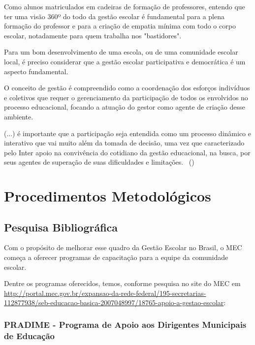 \documentclass[
	12pt,				%
	openright,			%
	oneside,
	a4paper,			%
	chapter=TITLE,		%
	section=TITLE,		%
	sumario=abnt-6027-2012,
	english,			%
	brazil				%
]{abntex2}
\newcommand{\citeaa}[1]{\citeauthoronline{#1}~(\citeyear{#1})}
\begin{document}
	Como alunos matriculados em cadeiras de formação de professores, entendo que ter uma visão 360º do todo da gestão escolar é fundamental para a plena formação do professor e para a criação de empatia mínima com todo o corpo escolar, notadamente para quem trabalha nos "bastidores".
	
	Para   um   bom   desenvolvimento   de   uma   escola, ou de uma comunidade escolar local,   é   preciso   considerar   que a gestão escolar participativa e democrática é um aspecto fundamental. 
	
	O   conceito   de   gestão   é   compreendido   como   a   coordenação   dos   esforços indivíduos  e   coletivos   que   requer   o   gerenciamento   da   participação   de   todos   os envolvidos no processo educacional, focando a atuação do gestor como agente de criação desse ambiente.
	
	\begin{citacao}
		(...) é importante que a participação seja entendida como um processo dinâmico e interativo que vai muito além da tomada de decisão, uma vez que caracterizado pelo Inter apoio na convivência do cotidiano da gestão educacional, na busca, por seus agentes de superação de suas dificuldades e limitações. \citeaa{Luck1996}
	\end{citacao}
	
			
\chapter{Procedimentos Metodológicos}

	\section{Pesquisa Bibliográfica} 

	Com  o  propósito  de   melhorar  esse  quadro  da  Gestão   Escolar  no  Brasil,  o  MEC começa   a   oferecer   programas   de   capacitação   para   a   equipe   da   comunidade escolar.
	
	Dentre os programas oferecidos, temos, conforme pesquisa no site do MEC em \url{http://portal.mec.gov.br/expansao-da-rede-federal/195-secretarias-112877938/seb-educacao-basica-2007048997/18765-apoio-a-gestao-escolar}: 
	
	\subsection{PRADIME - Programa de Apoio  aos Dirigentes Municipais de Educação}
\end{document}
